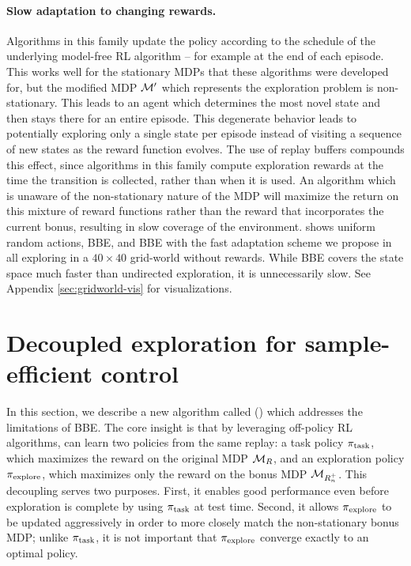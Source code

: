 \paragraph{Slow adaptation to changing rewards.}
Algorithms in this family update the policy according to the schedule of the underlying model-free RL algorithm -- for example at the end of each episode.
This works well for the stationary MDPs that these algorithms were developed for, but the modified MDP $\mathcal{M}'$ which represents the exploration problem is non-stationary.
This leads to an agent which determines the most novel state and then stays there for an entire episode.
This degenerate behavior leads to potentially exploring only a single state per episode instead of visiting a sequence of new states as the reward function evolves.
The use of replay buffers compounds this effect, since algorithms in this family compute exploration rewards at the time the transition is collected, rather than when it is used.
An algorithm which is unaware of the non-stationary nature of the MDP will maximize the return on this mixture of reward functions rather than the reward that incorporates the current bonus, resulting in slow coverage of the environment.
 shows uniform random actions, BBE, and BBE with the fast adaptation scheme we propose in  all exploring in a $40 \times 40$ grid-world without rewards.
While BBE covers the state space much faster than undirected exploration, it is unnecessarily slow.
See Appendix \ref{sec:gridworld-vis} for visualizations.


\section{Decoupled exploration for sample-efficient control}
In this section, we describe a new algorithm called \algname{} (\algshort{}) which addresses the limitations of BBE.
The core insight is that by leveraging off-policy RL algorithms, \algshort{} can learn two policies from the same replay: a task policy $\pi_{\text{task}}$, which maximizes the reward on the original MDP $\mathcal{M}_R$, and an exploration policy $\pi_{\text{explore}}$, which maximizes only the reward on the bonus MDP $\mathcal{M}_{R^+_n}$.
This decoupling serves two purposes.
First, it enables good performance even before exploration is complete by using $\pi_{\text{task}}$ at test time.
Second, it allows $\pi_{\text{explore}}$ to be updated aggressively in order to more closely match the non-stationary bonus MDP; unlike $\pi_{\text{task}}$, it is not important that $\pi_{\text{explore}}$ converge exactly to an optimal policy.

